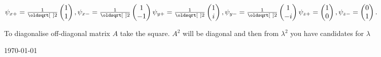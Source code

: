 $
\psi_{x+} = \frac{1}{\sqrt{2}} \begin{pmatrix} 1 \\  1 \end{pmatrix}, 
\psi_{x-} = \frac{1}{\sqrt{2}} \begin{pmatrix} 1 \\ -1 \end{pmatrix} \\
\psi_{y+} = \frac{1}{\sqrt{2}} \begin{pmatrix} 1 \\  i \end{pmatrix}, 
\psi_{y-} = \frac{1}{\sqrt{2}} \begin{pmatrix} 1 \\ -i \end{pmatrix} \\
\psi_{z+} =                  \begin{pmatrix} 1 \\  0 \end{pmatrix}, 
\psi_{z-} =                  \begin{pmatrix} 0 \\  1 \end{pmatrix}.
$


\columnbreak

\begin{squishlist}
    \item To diagonalise off-diagonal matrix $A$ take the square. $A^2$ will be diagonal and then from $\lambda^2$ you have candidates for $\lambda$
\end{squishlist}
\vfill
\today
